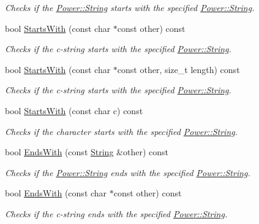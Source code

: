 \begin{DoxyCompactItemize}
\begin{DoxyCompactList}\small\item\em Checks if the \hyperlink{class_power_1_1_string}{Power\+::\+String} starts with the specified \hyperlink{class_power_1_1_string}{Power\+::\+String}. \end{DoxyCompactList}\item 
bool \hyperlink{class_power_1_1_string_a97d52a90799b590cfed6f3ce9d2204fc}{Starts\+With} (const char $\ast$const other) const
\begin{DoxyCompactList}\small\item\em Checks if the c-\/string starts with the specified \hyperlink{class_power_1_1_string}{Power\+::\+String}. \end{DoxyCompactList}\item 
bool \hyperlink{class_power_1_1_string_a5f0999383b26616b84abe75a4ea8a185}{Starts\+With} (const char $\ast$const other, size\+\_\+t length) const
\begin{DoxyCompactList}\small\item\em Checks if the c-\/string starts with the specified \hyperlink{class_power_1_1_string}{Power\+::\+String}. \end{DoxyCompactList}\item 
bool \hyperlink{class_power_1_1_string_a7c32b540950bc8b7061751333ec8ef17}{Starts\+With} (const char c) const
\begin{DoxyCompactList}\small\item\em Checks if the character starts with the specified \hyperlink{class_power_1_1_string}{Power\+::\+String}. \end{DoxyCompactList}\item 
bool \hyperlink{class_power_1_1_string_ae936d98f4be00ce5b901a561cac63ab0}{Ends\+With} (const \hyperlink{class_power_1_1_string}{String} \&other) const
\begin{DoxyCompactList}\small\item\em Checks if the \hyperlink{class_power_1_1_string}{Power\+::\+String} ends with the specified \hyperlink{class_power_1_1_string}{Power\+::\+String}. \end{DoxyCompactList}\item 
bool \hyperlink{class_power_1_1_string_a007514d96b8e99416e0c10f6b72675c5}{Ends\+With} (const char $\ast$const other) const
\begin{DoxyCompactList}\small\item\em Checks if the c-\/string ends with the specified \hyperlink{class_power_1_1_string}{Power\+::\+String}. \end{DoxyCompactList}\item 

\end{DoxyCompactItemize}
